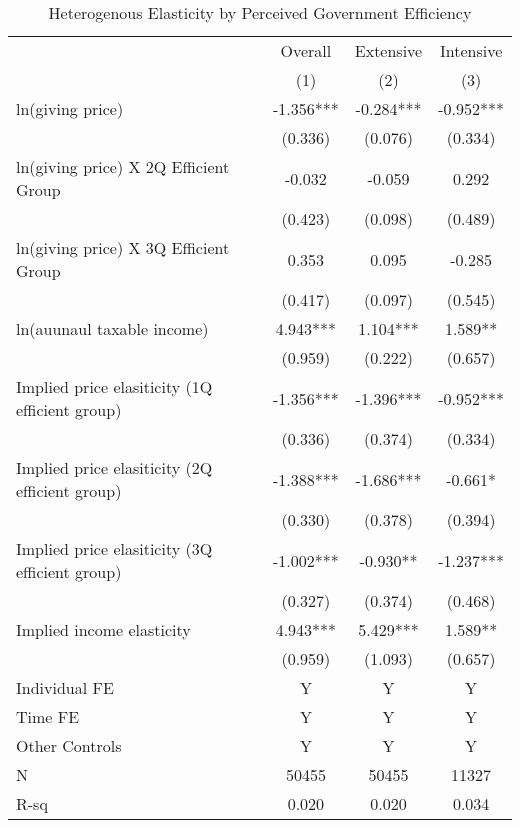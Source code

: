\documentclass[ review  , 3p ]{elsarticle}
\begin{document}
  \begin{table}
  
  \caption{\label{tab:kableHeteroElasticity}Heterogenous Elasticity by Perceived Government Efficiency}
  \centering
  \fontsize{8}{10}\selectfont
  \begin{threeparttable}
  \begin{tabular}[t]{lccc}
  \toprule
  \multicolumn{1}{c}{ } & \multicolumn{1}{c}{Overall} & \multicolumn{1}{c}{Extensive} & \multicolumn{1}{c}{Intensive} \\
  \cmidrule(l{3pt}r{3pt}){2-2} \cmidrule(l{3pt}r{3pt}){3-3} \cmidrule(l{3pt}r{3pt}){4-4}
   & (1) & (2) & (3)\\
  \midrule
  ln(giving price) & -1.356*** & -0.284*** & -0.952***\\
   & (0.336) & (0.076) & (0.334)\\
  ln(giving price) X 2Q Efficient Group & -0.032 & -0.059 & 0.292\\
   & (0.423) & (0.098) & (0.489)\\
  ln(giving price) X 3Q Efficient Group & 0.353 & 0.095 & -0.285\\
   & (0.417) & (0.097) & (0.545)\\
  ln(auunaul taxable income) & 4.943*** & 1.104*** & 1.589**\\
   & (0.959) & (0.222) & (0.657)\\
  Implied price elasiticity (1Q efficient group) & -1.356*** & -1.396*** & -0.952***\\
   & (0.336) & (0.374) & (0.334)\\
  Implied price elasiticity (2Q efficient group) & -1.388*** & -1.686*** & -0.661*\\
   & (0.330) & (0.378) & (0.394)\\
  Implied price elasiticity (3Q efficient group) & -1.002*** & -0.930** & -1.237***\\
   & (0.327) & (0.374) & (0.468)\\
  Implied income elasticity & 4.943*** & 5.429*** & 1.589**\\
   & (0.959) & (1.093) & (0.657)\\
  Individual FE & Y & Y & Y\\
  Time FE & Y & Y & Y\\
  Other Controls & Y & Y & Y\\
  N & 50455 & 50455 & 11327\\
  R-sq & 0.020 & 0.020 & 0.034\\
  \bottomrule
  \end{tabular}

\end{threeparttable}
\end{table}
\end{document}
